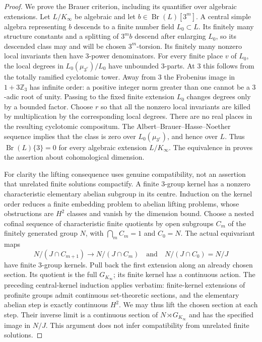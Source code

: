 \begin{proof}
We prove the Brauer criterion, including its quantifier over algebraic
extensions. Let $L/K_\infty$ be algebraic and let
$b\in\operatorname{Br}(L)[3^m]$. A central simple algebra representing
$b$ descends to a finite number field $L_0\subset L$. Its finitely
many structure constants and a splitting of $3^m b$ descend
after enlarging $L_0$, so its descended class may and will be
chosen $3^m$-torsion. Its finitely many nonzero local invariants
then have $3$-power denominators.
For every finite place $v$ of $L_0$, the local degrees in
$L_0(\mu_{3^r})/L_0$ have unbounded $3$-parts. At $3$ this follows
from the totally ramified cyclotomic tower. Away from $3$ the
Frobenius image in $1+3\mathbb Z_3$ has infinite order: a positive
integer norm greater than one cannot be a $3$-adic root of unity.
Passing to the fixed finite extension $L_0$ changes degrees only by
a bounded factor. Choose $r$ so that all the nonzero local invariants
are killed by multiplication by the corresponding local degrees.
There are no real places in the resulting cyclotomic compositum.
The Albert--Brauer--Hasse--Noether sequence
\citep[VIII, Theorem 4.2]{BMilneCFT2020} implies that the class is
zero over $L_0(\mu_{3^r})$, and hence over $L$.
Thus $\operatorname{Br}(L)\{3\}=0$ for every algebraic extension
$L/K_\infty$. The equivalence in
\citet[Theorem 6.1.8]{BGilleSzamuely2006} proves the assertion about
cohomological dimension.

For clarity the lifting consequence uses genuine compatibility, not
an assertion that unrelated finite solutions compactify. A finite
$3$-group kernel has a nonzero characteristic elementary abelian
subgroup in its centre. Induction on the kernel order reduces a
finite embedding problem to abelian lifting problems, whose
obstructions are $H^2$ classes and vanish by the dimension bound.
Choose a nested cofinal sequence of characteristic finite quotients
by open subgroups $C_m$ of the finitely generated group $N$,
with $\bigcap_mC_m=1$ and $C_0=N$. The actual equivariant
maps
\[
 N/(J\cap C_{m+1})\longrightarrow N/(J\cap C_m)
 \quad\text{and}\quad N/(J\cap C_0)=N/J
\]
have finite $3$-group kernels. Pull back the first extension
along an already chosen section. Its quotient is the full
$G_{K_\infty}$; its finite kernel has a continuous action.
The preceding central-kernel induction applies verbatim:
finite-kernel extensions of profinite groups admit continuous
set-theoretic sections, and the elementary abelian step is
exactly continuous $H^2$. We may thus lift the chosen section
at each step. Their inverse limit is a continuous section of
$N\rtimes G_{K_\infty}$ and has the specified image in $N/J$.
This argument does not infer compatibility from unrelated
finite solutions.


\end{proof}
